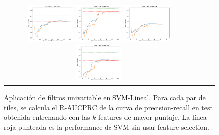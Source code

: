 \begin{figure}[h!]
\begin{tabular}{cccc}
\includegraphics[width=0.25\textwidth]{Kap5/linear_ALL_METHODS_train=b278test=b234}  \includegraphics[width=0.25\textwidth]{Kap5/linear_ALL_METHODS_train=b278test=b261} 
 \includegraphics[width=0.25\textwidth]{Kap5/linear_ALL_METHODS_train=b360test=b234}  \includegraphics[width=0.25\textwidth]{Kap5/linear_ALL_METHODS_train=b360test=b278} 
\end{tabular}
\caption{Aplicación de filtros univariable en SVM-Lineal. Para cada par de tiles, se calcula el R-AUCPRC de la curva de precision-recall en test obtenida entrenando con las $k$ features de mayor puntaje. La línea roja punteada es la performance de SVM sin usar feature selection.}
\label{fig:svml_univariate}
\end{figure}

